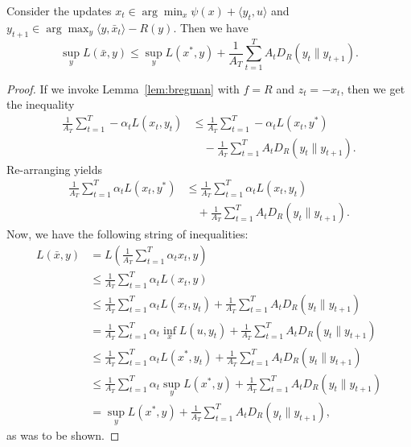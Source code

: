 \documentclass[paper.tex]{subfiles}
\begin{document}
\begin{proposition}
\label{prop:method-2}
Consider the updates $x_t \in \arg\min_{x} \psi(x) + \langle y_t, u \rangle$ 
and $y_{t+1} \in \arg\max_{y} \langle y, \bar{x}_t \rangle - R(y)$. 
Then we have 
\begin{equation}
\sup_{y} L(\bar{x}, y) \leq \sup_{y} L(x^*, y) + \frac{1}{A_T} \sum_{t=1}^T A_tD_{R}(y_t \| y_{t+1}).
\end{equation}
\end{proposition}
\begin{proof}
If we invoke Lemma~\ref{lem:bregman} with $f=R$ and $z_t=-x_t$, then we get 
the inequality
\begin{align}
\frac{1}{A_T} \sum_{t=1}^T -\alpha_t L(x_t, y_t) 
&\leq \frac{1}{A_T} \sum_{t=1}^T -\alpha_t L(x_t, y^*) \\
&\quad - \frac{1}{A_T} \sum_{t=1}^T A_tD_R(y_t \| y_{t+1}). \nonumber
\end{align}
Re-arranging yields
\begin{align}
\frac{1}{A_T }\sum_{t=1}^T \alpha_t L(x_t, y^*) 
&\leq \frac{1}{A_T} \sum_{t=1}^T \alpha_t L(x_t, y_t) \\
&\quad+ \frac{1}{A_T} \sum_{t=1}^T A_tD_R(y_t \| y_{t+1}). 
\end{align}
Now, we have the following string of inequalities:
\begin{align*}
L(\bar{x}, y) &= L\left(\frac{1}{A_T} \sum_{t=1}^T \alpha_t x_t, y\right) \\
 &\leq \frac{1}{A_T} \sum_{t=1}^T \alpha_t L(x_t, y) \\
 &\leq \frac{1}{A_T} \sum_{t=1}^T \alpha_t L(x_t, y_t) + \frac{1}{A_T} \sum_{t=1}^T A_t D_R(y_t \| y_{t+1}) \\
 &= \frac{1}{A_T} \sum_{t=1}^T \alpha_t \inf_{x} L(u, y_t) + \frac{1}{A_T} \sum_{t=1}^T A_tD_R(y_t \| y_{t+1}) \\
 &\leq \frac{1}{A_T} \sum_{t=1}^T \alpha_t L(x^*, y_t) + \frac{1}{A_T} \sum_{t=1}^T A_tD_R(y_t \| y_{t+1}) \\
 &\leq \frac{1}{A_T} \sum_{t=1}^T \alpha_t \sup_{y} L(x^*, y) + \frac{1}{A_T} \sum_{t=1}^T A_tD_R(y_t \| y_{t+1}) \\
 &= \sup_{y} L(x^*, y) + \frac{1}{A_T} \sum_{t=1}^T A_tD_R(y_t \| y_{t+1}),
\end{align*}
as was to be shown.
\end{proof}
\end{document}
